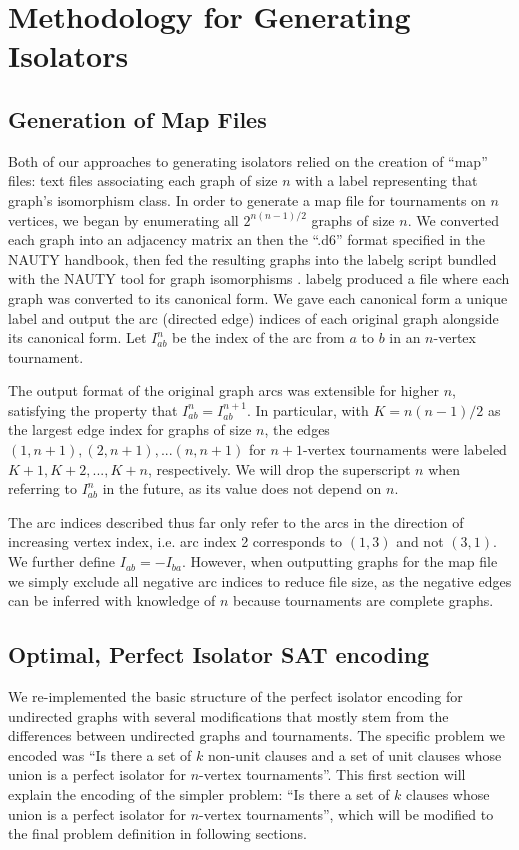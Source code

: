 \documentclass[a4paper,UKenglish,cleveref, autoref, thm-restate]{lipics-v2021}
\begin{document}
\section{Methodology for Generating Isolators}

\subsection{Generation of Map Files}
Both of our approaches to generating isolators relied on the creation of ``map'' files: text files associating each graph of size $n$ with a label representing that graph's isomorphism class. In order to generate a map file for tournaments on $n$ vertices, we began by enumerating all $2^{n(n-1)/2}$ graphs of size $n$. We converted each graph into an adjacency matrix an then the ``.d6'' format specified in the NAUTY handbook, then fed the resulting graphs into the labelg script bundled with the NAUTY tool for graph isomorphisms \cite{ref_nauty}. labelg produced a file where each graph was converted to its canonical form. We gave each canonical form a unique label and output the arc (directed edge) indices of each original graph alongside its canonical form. Let $I_{ab}^n$ be the index of the arc from $a$ to $b$ in an $n$-vertex tournament.

The output format of the original graph arcs was extensible for higher $n$, satisfying the property that $I_{ab}^n = I_{ab}^{n+1}$. In particular, with $K = n(n-1)/2$ as the largest edge index for graphs of size $n$, the edges $(1,n+1), (2,n+1), ... (n, n+1)$ for $n+1$-vertex tournaments were labeled $K+1, K+2,...,K+n$, respectively. We will drop the superscript $n$ when referring to $I_{ab}^n$ in the future, as its value does not depend on $n$.

The arc indices described thus far only refer to the arcs in the direction of increasing vertex index, i.e. arc index 2 corresponds to $(1,3)$ and not $(3,1)$. We further define $I_{ab} = -I_{ba}$. However, when outputting graphs for the map file we simply exclude all negative arc indices to reduce file size, as the negative edges can be inferred with knowledge of $n$ because tournaments are complete graphs.

\subsection{Optimal, Perfect Isolator SAT encoding}

We re-implemented the basic structure of the perfect isolator encoding for undirected graphs \cite{ref_heule} with several modifications that mostly stem from the differences between undirected graphs and tournaments. The specific problem we encoded was ``Is there a set of $k$ non-unit clauses and a set of unit clauses whose union is a perfect isolator for $n$-vertex tournaments''. This first section will explain the encoding of the simpler problem: ``Is there a set of $k$ clauses whose union is a perfect isolator for $n$-vertex tournaments'', which will be modified to the final problem definition in following sections.
\end{document}
